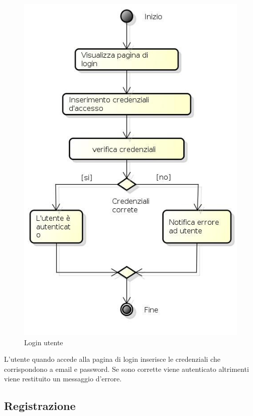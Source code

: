 \begin{figure}[h!]
		\centering
		\includegraphics[scale=.5]{img/Login.jpg}
		\caption{Login utente}
		\label{fig:Login}
\end{figure}

L'utente quando accede alla pagina di login inserisce le credenziali che corrispondono a email e password. Se sono corrette viene autenticato altrimenti viene restituito un messaggio d'errore.

\newpage

\subsection{Registrazione}

